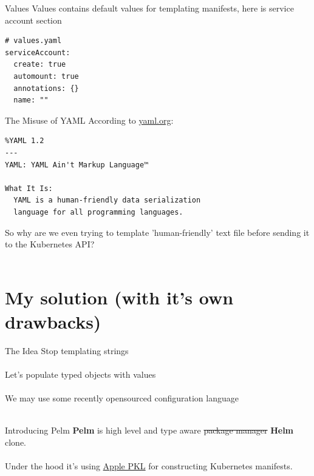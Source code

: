 \documentclass[11pt, aspectratio=169]{beamer}
\begin{document}
\begin{frame}[fragile]{ Values}
	Values contains default values for templating manifests,
	here is service account section
	\begin{verbatim}
# values.yaml
serviceAccount:
  create: true
  automount: true
  annotations: {}
  name: ""
	\end{verbatim}
\end{frame}

\begin{frame}[fragile]{ The Misuse of YAML  }
	According to \href{https://yaml.org}{yaml.org}:
	\begin{verbatim}
%YAML 1.2
---
YAML: YAML Ain't Markup Language™

What It Is:
  YAML is a human-friendly data serialization
  language for all programming languages.
    \end{verbatim}

	So why are we even trying to template 'human-friendly' text file
	before sending it to the Kubernetes API?\\~\\
	\centerline{{\Huge {}}}
\end{frame}

\section{My solution (with it's own drawbacks)}

\begin{frame}[fragile]{ The Idea}
	 Stop templating strings\\~\\
	 Let's populate typed objects with values\\~\\

	We may use some recently opensourced configuration language\\~\\
	\centerline{{\Huge {} }}
\end{frame}

\begin{frame}{ Introducing Pelm}
	\textbf{Pelm} is high level and type aware \sout{package manager} \textbf{Helm} clone.\\~\\
	Under the hood it's using \href{https://pkl-lang.org}{Apple PKL} for constructing Kubernetes manifests.\\~\\
\end{frame}
\end{document}
